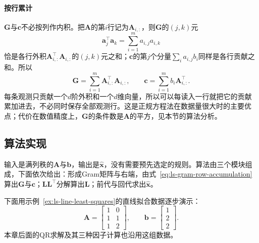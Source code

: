 \paragraph{按行累计}
$\bm G$与$\bm c$不必按列作内积。把$\bm A$的第$i$行记为$\bm A_{i,:}$，则$\bm G$的$(j,k)$元
\[
 \bm a_j^\top\bm a_k=\sum_{i=1}^m a_{i,j}a_{i,k}
\]
恰是各行外积$\bm A_{i,:}^\top\bm A_{i,:}$的$(j,k)$元之和；$\bm c$的第$j$个分量$\sum_{i}a_{i,j}b_i$同样是各行贡献之和。所以
\begin{equation}
 \bm G=\sum_{i=1}^m\bm A_{i,:}^\top\bm A_{i,:},\qquad
 \bm c=\sum_{i=1}^mb_i\bm A_{i,:}^\top .
 \label{eq:ls-gram-row-accumulation}
\end{equation}
每条观测只贡献一个$d$阶外积和一个$d$维向量，所以可以每读入一行就把它的贡献累加进去，不必同时保存全部观测行。这是正规方程法在数据量很大时的主要优点；代价在数值精度上，$\bm G$的条件数是$\bm A$的平方，见本节的算法分析。

\subsection{算法实现}

输入是满列秩的$\bm A$与$\bm b$，输出是$\hat{\bm x}$，没有需要预先选定的规则。算法由三个模块组成，下面依次给出：形成Gram矩阵与右端，由式~\eqref{eq:ls-gram-row-accumulation}算出$\bm G$与$\bm c$；$\bm L\bm L^\top$分解算出$\bm L$；前代与回代求出$\hat{\bm x}$。

下面用示例~\ref{ex:ls-line-least-squares}的直线拟合数据逐步演示：
\[
 \bm A=\begin{bmatrix}1&0\\1&1\\1&2\end{bmatrix},\qquad
 \bm b=\begin{bmatrix}1\\2\\2\end{bmatrix}.
\]
本章后面的QR求解及其三种因子计算也沿用这组数据。

